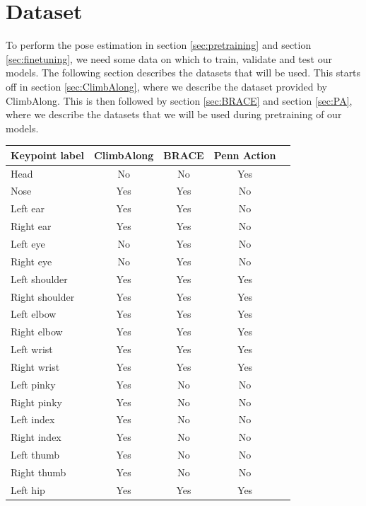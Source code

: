 \documentclass[./main.tex]{subfiles}
\begin{document}
\section{Dataset}
\label{sec:dataset}
To perform the pose estimation in section \ref{sec:pretraining} and section \ref{sec:finetuning}, we need some data on which to train, validate and test our models. The following section describes the datasets that will be used. This starts off in section \ref{sec:ClimbAlong}, where we describe the dataset provided by ClimbAlong. This is then followed by section \ref{sec:BRACE} and section \ref{sec:PA}, where we describe the datasets that we will be used during pretraining of our models.

\begin{table}[htbp]
    \begin{tabular}{|l|c|c|c|c|}
        \hline
        \textbf{Keypoint label} & \textbf{ClimbAlong} & \textbf{BRACE} & \textbf{Penn Action} \\ \hline
        Head & No & No & Yes \\ \hline
        Nose & Yes & Yes & No \\ \hline
        Left ear & Yes & Yes & No \\ \hline
        Right ear & Yes & Yes & No \\ \hline
        Left eye & No & Yes & No \\ \hline
        Right eye & No & Yes & No \\ \hline
        Left shoulder & Yes & Yes & Yes \\ \hline
        Right shoulder & Yes & Yes & Yes \\ \hline
        Left elbow & Yes & Yes & Yes \\ \hline
        Right elbow & Yes & Yes & Yes \\ \hline
        Left wrist & Yes & Yes & Yes \\ \hline
        Right wrist & Yes & Yes & Yes \\ \hline
        Left pinky & Yes & No & No \\ \hline
        Right pinky & Yes & No & No \\ \hline
        Left index & Yes & No & No \\ \hline
        Right index & Yes & No & No \\ \hline
        Left thumb & Yes & No & No \\ \hline
        Right thumb & Yes & No & No \\ \hline
        Left hip & Yes & Yes & Yes \\ \hline

\end{tabular}
\end{table}
\end{document}
